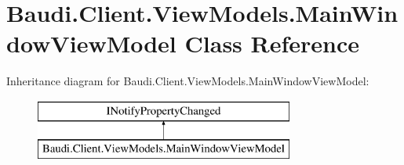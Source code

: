 \hypertarget{class_baudi_1_1_client_1_1_view_models_1_1_main_window_view_model}{}\section{Baudi.\+Client.\+View\+Models.\+Main\+Window\+View\+Model Class Reference}
\label{class_baudi_1_1_client_1_1_view_models_1_1_main_window_view_model}
Inheritance diagram for Baudi.\+Client.\+View\+Models.\+Main\+Window\+View\+Model\+:\begin{figure}[H]
\begin{center}
\leavevmode
\includegraphics[height=2.000000cm]{class_baudi_1_1_client_1_1_view_models_1_1_main_window_view_model}
\end{center}
\end{figure}
